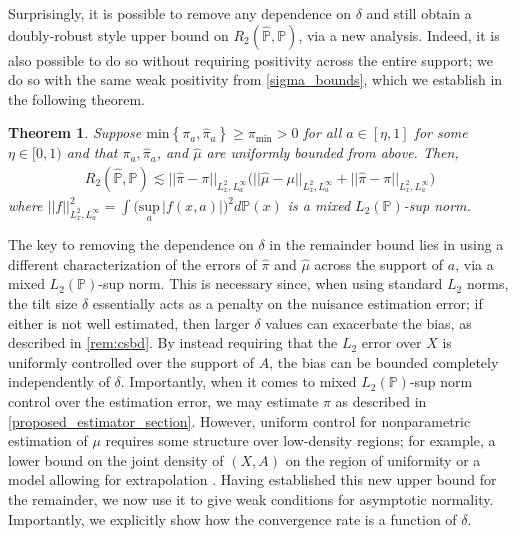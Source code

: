 \documentclass[11pt,twoside]{article}
\newcommand{\Pb}{\mathbb{P}}
\newtheorem{theorem}{Theorem}
\theoremstyle{definition}
\theoremstyle{remark}
\begin{document}
Surprisingly, it is possible to remove any dependence on $\delta$ and still obtain a doubly-robust style upper bound on $R_2(\widehat{\mathbb{P}}, \mathbb{P})$, via a new analysis. Indeed, it is also possible to do so without requiring positivity across the entire support; we do so with the same weak positivity from \cref{sigma_bounds}, which we establish in the following theorem. 

\begin{theorem} \label{remainder_bound}
    Suppose $\text{min}\left\{ \pi_a, \widehat{\pi}_a \right\} \geq \pi_{\min} >0$ for all $a \in  [\eta, 1]$ for some $\eta \in [0, 1)$ and that $\pi_a, \widehat{\pi}_a$, and $\widehat{\mu}$ are uniformly bounded from above. Then,
    \begin{align*}
        R_2(\widehat{\mathbb{P}}, \mathbb{P}) \lesssim  || \widehat{\pi} - \pi||_{L^2_x, L^\infty_a} \Big(  || \widehat{\mu} - \mu ||_{L^2_x, L^\infty_a}  +  || \widehat{\pi} - \pi||_{L^2_x, L^\infty_a} \Big)
    \end{align*}
    where $||f||^2_{L^2_x, L^\infty_a} =  \int \big( \underset{a}{\text{sup}} \, |f(x, a) | \big)^2 d \mathbb{P}(x)$ is a mixed $L_2(\mathbb{P})$-sup norm.
\end{theorem}

The key to removing the dependence on $\delta$ in the remainder bound lies in using a different characterization of the  errors of $\widehat{\pi}$ and $\widehat{\mu}$ across the support of $a$, via a mixed $L_2(\Pb)$-sup norm. This is necessary since,  when using standard $L_2$ norms, the tilt size $\delta$ essentially acts as a penalty on the nuisance estimation error; if either is not well estimated, then larger $\delta$ values can exacerbate the bias, as described in \cref{rem:csbd}. By instead requiring that the $L_2$ error over $X$ is uniformly controlled over the support of $A$, the bias can be bounded completely independently of $\delta$. Importantly, when it comes to mixed $L_2(\Pb)$-sup norm control over the estimation error, we may estimate $\pi$ as described in \cref{proposed_estimator_section}. However, uniform control for nonparametric estimation of $\mu$ requires some structure over low-density regions; for example, a lower bound on the joint density of $(X, A)$ on the region of uniformity or a model allowing for extrapolation \citep{hansen_uniform}. Having established this new upper bound for the remainder, we now use it to give weak conditions for asymptotic normality. Importantly, we explicitly show how the convergence rate is a function of $\delta$.
\end{document}
